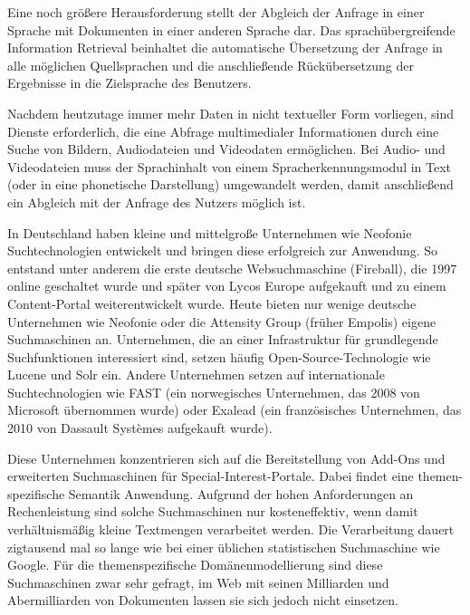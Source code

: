 \documentclass[]{../../metanetpaper}
\begin{document}
\begin{Parallel}[c]{79mm}{78mm}
{Eine noch größere Herausforderung stellt der Abgleich der Anfrage in einer Sprache mit Dokumenten in einer anderen Sprache dar. Das sprachübergreifende Information Retrieval beinhaltet die automatische Übersetzung der Anfrage in alle möglichen Quellsprachen und die anschließende Rückübersetzung der Ergebnisse in die Zielsprache des Benutzers. 

Nachdem heutzutage immer mehr Daten in nicht textueller Form vorliegen, sind Dienste erforderlich, die eine Abfrage multimedialer Informationen durch eine Suche von Bildern, Audiodateien und Videodaten ermöglichen. Bei Audio- und Videodateien muss der Sprachinhalt von einem Spracherkennungsmodul in Text (oder in eine phonetische Darstellung) umgewandelt werden, damit anschließend ein Abgleich mit der Anfrage des Nutzers möglich ist.

In Deutschland haben kleine und mittelgroße Unternehmen wie Neofonie Suchtechnologien entwickelt und bringen diese erfolgreich zur Anwendung. So entstand unter anderem die erste deutsche Websuchmaschine (Fireball), die 1997 online geschaltet wurde und später von Lycos Europe aufgekauft und zu einem Content-Portal weiterentwickelt wurde. Heute bieten nur wenige deutsche Unternehmen wie Neofonie oder die Attensity Group (früher Empolis) eigene Suchmaschinen an. Unternehmen, die an einer Infrastruktur für grundlegende Suchfunktionen interessiert sind, setzen häufig Open-Source-Technologie wie Lucene und Solr ein. Andere Unternehmen setzen auf internationale Suchtechnologien wie FAST (ein norwegisches Unternehmen, das 2008 von Microsoft übernommen wurde) oder Exalead (ein französisches Unternehmen, das 2010 von Dassault Systèmes aufgekauft wurde).

Diese Unternehmen konzentrieren sich auf die Bereitstellung von Add-Ons und erweiterten Suchmaschinen für Special-Interest-Portale. Dabei findet eine themen-spezifische Semantik Anwendung. Aufgrund der hohen Anforderungen an Rechenleistung sind solche Suchmaschinen nur kosteneffektiv, wenn damit verhältnismäßig kleine Textmengen verarbeitet werden. Die Verarbeitung dauert zigtausend mal so lange wie bei einer üblichen statistischen Suchmaschine wie Google. Für die themenspezifische Domänenmodellierung sind diese Suchmaschinen zwar sehr gefragt, im Web mit seinen Milliarden und Abermilliarden von Dokumenten lassen sie sich jedoch nicht einsetzen.

}
\end{Parallel}
\end{document}

